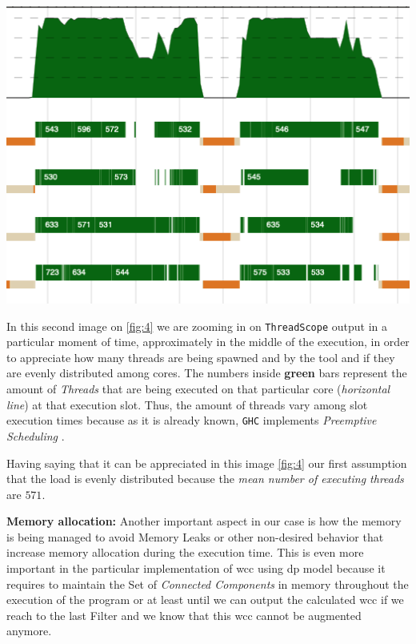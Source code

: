 \documentclass[preprint]{elsarticle}
\begin{document}
\begin{minipage}[t]{\linewidth}
  \includegraphics[width=\textwidth]{screen_2}
  \captionsetup{type=figure}
  \label{fig:4}
\end{minipage}

In this second image on \autoref{fig:4} we are zooming in on \texttt{ThreadScope} output in a particular moment of time, approximately in the middle of the execution, in order to appreciate how many threads are being spawned and by the tool and if they are evenly distributed among cores. The numbers inside \textbf{green} bars represent the amount of \textit{Threads} that are being executed on that particular core (\textit{horizontal line}) at that execution slot. Thus, the amount of threads vary among slot execution times because as it is already known, \texttt{GHC} implements \emph{Preemptive Scheduling} \cite{lightweightghc}.

Having saying that it can be appreciated in this image \autoref{fig:4} our first assumption that the load is evenly distributed because the \textit{mean number of executing threads} are $571$.

\textbf{Memory allocation:} Another important aspect in our case is how the memory is being managed to avoid Memory Leaks or other non-desired behavior that increase memory allocation during the execution time. This is even more important in the particular implementation of \acrshort{wcc} using \acrshort{dp} model because it requires to maintain the Set of \textit{Connected Components} in memory throughout the execution of the program or at least until we can output the calculated \acrshort{wcc} if we reach to the last Filter and we know that this \acrshort{wcc} cannot be augmented anymore. 
\end{document}
